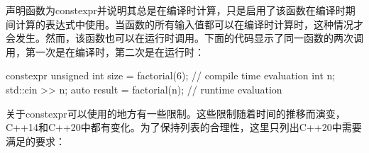 \begin{myNotic}
声明函数为constexpr并说明其总是在编译时计算，只是启用了该函数在编译时期间计算的表达式中使用。当函数的所有输入值都可以在编译时计算时，这种情况才会发生。然而，该函数也可以在运行时调用。下面的代码显示了同一函数的两次调用，第一次是在编译时，第二次是在运行时：

\begin{cpp}
constexpr unsigned int size = factorial(6);
// compile time evaluation
int n;
std::cin >> n;
auto result = factorial(n);
// runtime evaluation
\end{cpp}
\end{myNotic}

关于constexpr可以使用的地方有一些限制。这些限制随着时间的推移而演变，C++14和C++20中都有变化。为了保持列表的合理性，这里只列出C++20中需要满足的要求：

